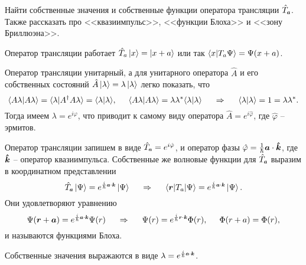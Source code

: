 
\begin{leftrules}
    Найти собственные значения и собственные функции оператора трансляции $\hat{T}_{\smallvc{a}}$. Также рассказать про <<квазиимпульс>>, <<функции Блоха>> и <<зону Бриллюэна>>.
\end{leftrules}


Оператор трансляции работает $\hat{T}_a \left| x \right\rangle = \left| x+a \right\rangle$ или так $\bk{x}{T_a\Psi} = \Psi(x + a)$.  

Оператор трансляции унитарный, а для унитарного оператора $\hat{A}$ и его собственных состояний $\hat{A} \left| \lambda \right\rangle = \lambda \left| \lambda \right\rangle$ легко показать, что
\begin{equation*}
\bk{A \lambda}{A \lambda} = \bk{\lambda}{A^\dagger A \lambda} = \bk{\lambda}{\lambda},
\hspace{5 mm} 
\bk{A \lambda}{A \lambda} = \lambda \lambda^*\bk{\lambda}{\lambda}
    \hspace{5 mm} 
    \Rightarrow
    \hspace{5 mm} 
    \bk{\lambda}{\lambda} = 1 = \lambda \lambda^*.
\end{equation*}
Тогда имеем $\lambda = e^{i \varphi}$, что приводит к самому виду оператора $\hat{A} = e^{i \hat{\varphi}}$, где $\hat{\varphi}$ -- эрмитов.


Оператор трансляции запишем в виде $\hat{T}_{\smallvc{a}} = e^{i \hat{\varphi}}$, и оператор фазы $\hat{\varphi} = \frac{1}{\hbar} \mbox{\boldmath $a$} \cdot \mbox{\boldmath $\hat{k}$}$, где $\mbox{\boldmath $\hat{k}$}$ -- оператор квазиимпульса.
Собственные же волновые функции для $\hat{T}_{\smallvc{a}}$ выразим в координатном представлении
\begin{equation*}
    \hat{T}_{\smallvc{a}} \ket{\Psi} = e^{\frac{i}{\hbar} \smallvc{a} \cdot \smallvc{k}} \ket{\Psi}
    \hspace{5 mm} 
    \Rightarrow
    \hspace{5 mm} 
    \bk{\vc{r}}[T_a]{\Psi} = e^{\frac{i}{\hbar} \smallvc{a} \cdot \smallvc{k}} \ket{\Psi}.
\end{equation*}
Они удовлетворяют уравнению
\begin{equation*}
    \Psi(\vc{r} + \vc{a}) = e^{\frac{i}{\hbar} \smallvc{a} \cdot \smallvc{k}} \Psi (r)
    \hspace{5 mm} 
    \Rightarrow
    \hspace{5 mm} 
    \Psi(r) = e^{\frac{i}{\hbar} \smallvc{r} \cdot \smallvc{k}} \Phi(r), 
    \hspace{0.5 cm}
    \Phi(r + a) = \Phi(r),
\end{equation*}
и называются функциями Блоха.

Собственные значения выражаются в виде $\lambda = e^{\frac{i}{\hbar} \smallvc{a} \cdot \smallvc{k}}$.


